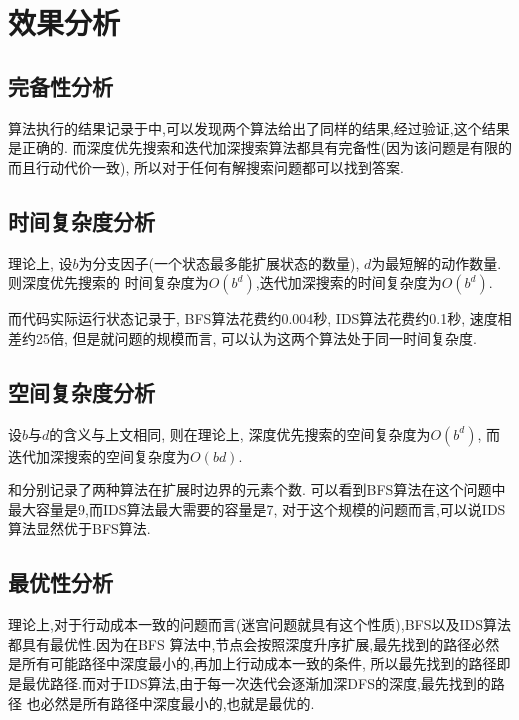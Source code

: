     \section{效果分析}
    
    \subsection{完备性分析}

    算法执行的结果记录于中,可以发现两个算法给出了同样的结果,经过验证,这个结果是正确的.
    而深度优先搜索和迭代加深搜索算法都具有完备性(因为该问题是有限的而且行动代价一致),
    所以对于任何有解搜索问题都可以找到答案.

    \subsection{时间复杂度分析}
    
    理论上, 设\(b\)为分支因子(一个状态最多能扩展状态的数量), \(d\)为最短解的动作数量.则深度优先搜索的
    时间复杂度为\(O(b^{d})\),迭代加深搜索的时间复杂度为\(O(b^d)\).

    而代码实际运行状态记录于, BFS算法花费约0.004秒, IDS算法花费约0.1秒, 
    速度相差约25倍, 但是就问题的规模而言, 可以认为这两个算法处于同一时间复杂度.

    \subsection{空间复杂度分析}

    设\(b\)与\(d\)的含义与上文相同, 则在理论上, 深度优先搜索的空间复杂度为\(O(b^d)\), 
    而迭代加深搜索的空间复杂度为\(O(bd)\).

    和分别记录了两种算法在扩展时边界的元素个数.
    可以看到BFS算法在这个问题中最大容量是9,而IDS算法最大需要的容量是7,
    对于这个规模的问题而言,可以说IDS算法显然优于BFS算法.

    \subsection{最优性分析}

    理论上,对于行动成本一致的问题而言(迷宫问题就具有这个性质),BFS以及IDS算法都具有最优性.因为在BFS
    算法中,节点会按照深度升序扩展,最先找到的路径必然是所有可能路径中深度最小的,再加上行动成本一致的条件,
    所以最先找到的路径即是最优路径.而对于IDS算法,由于每一次迭代会逐渐加深DFS的深度,最先找到的路径
    也必然是所有路径中深度最小的,也就是最优的.

